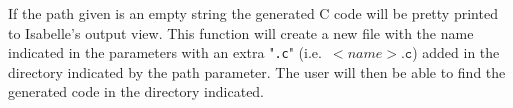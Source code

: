 If the path given is an empty string the generated C code will be pretty printed to Isabelle's output view.
This function will create a new file with the name indicated in the parameters with an extra "\verb|.c|" (i.e.\ $<name>\mathtt{.c}$) added in the directory indicated by the path parameter.
The user will then be able to find the generated code in the directory indicated.